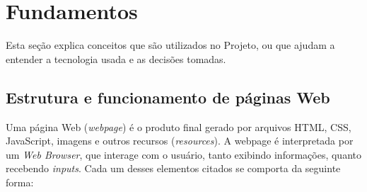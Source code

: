 \documentclass[a4paper,12pt]{article}
\begin{document}
\newpage
\section{Fundamentos}

Esta seção explica conceitos que são utilizados no Projeto, ou que ajudam a entender a tecnologia usada e as decisões tomadas.

\subsection{Estrutura e funcionamento de páginas Web}

Uma página Web (\emph{webpage}) é o produto final gerado por arquivos HTML, CSS, JavaScript, imagens e outros recursos (\emph{resources}). A webpage é interpretada por um \emph{Web Browser}, que interage com o usuário, tanto exibindo informações, quanto recebendo \emph{inputs}. Cada um desses elementos citados se comporta da seguinte forma:
\end{document}
